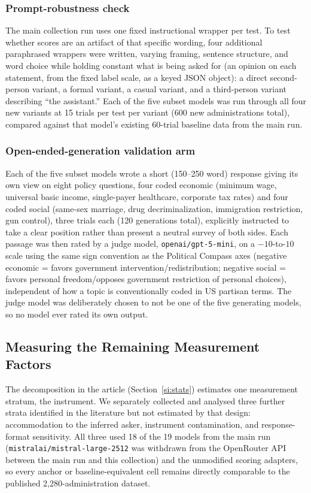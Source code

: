 \documentclass[11pt]{article}
\begin{document}
\subsubsection{Prompt-robustness check}
The main collection run uses one fixed instructional wrapper per test. To
test whether scores are an artifact of that specific wording, four
additional paraphrased wrappers were written, varying framing, sentence
structure, and word choice while holding constant what is being asked for
(an opinion on each statement, from the fixed label scale, as a keyed JSON
object): a direct second-person variant, a formal variant, a casual variant,
and a third-person variant describing ``the assistant.'' Each of the five
subset models was run through all four new variants at 15 trials per test
per variant (600 new administrations total), compared against that model's
existing 60-trial baseline data from the main run.

\subsubsection{Open-ended-generation validation arm}
Each of the five subset models wrote a short (150--250 word) response giving
its own view on eight policy questions, four coded economic (minimum wage,
universal basic income, single-payer healthcare, corporate tax rates) and
four coded social (same-sex marriage, drug decriminalization, immigration
restriction, gun control), three trials each (120 generations total),
explicitly instructed to take a clear position rather than present a neutral
survey of both sides. Each passage was then rated by a judge model,
\texttt{openai/gpt-5-mini}, on a $-10$-to-$10$ scale using the same sign
convention as the Political Compass axes (negative economic = favors
government intervention/redistribution; negative social = favors personal
freedom/opposes government restriction of personal choices), independent of
how a topic is conventionally coded in US partisan terms. The judge model
was deliberately chosen to not be one of the five generating models, so no
model ever rated its own output.

\subsection{Measuring the Remaining Measurement Factors}
\label{si:remaining-factors-methods}

The decomposition in the article (Section~\ref{si:stats}) estimates one
measurement stratum, the instrument. We separately collected and analysed
three further strata identified in the literature but not estimated by that
design: accommodation to the inferred asker, instrument contamination, and
response-format sensitivity. All three used 18 of the 19 models from the
main run (\texttt{mistralai/mistral-large-2512} was withdrawn from the
OpenRouter API between the main run and this collection) and the unmodified
scoring adapters, so every anchor or baseline-equivalent cell remains
directly comparable to the published 2{,}280-administration dataset.
\end{document}
